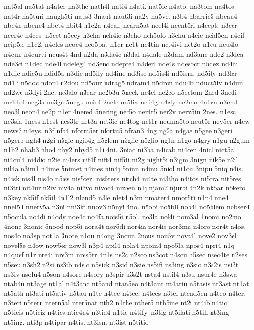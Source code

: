 {nat5al
na5tat
n4atee
na3the
nath4l
nati4
n4ati.
nat5ic
n4ato.
na3tom
na4tos
nat4r
na5turi
naugh5ti
naus3
3naut
naut3i
na2v
na5vel
n3b4
nbarric5
nbeau4
nbe4n
nbene4
nbet4
nbit4
n1c2a
n4cal.
ncarn5at
ncel4i
ncent5ri
n4cept.
n3cer
ncer4e
n4ces.
n5cet
n5cey
n3cha
nch4ie
n3cho
nch5olo
n3chu
n4cic
ncid5en
n4cif
ncip5ie
n1c2l
n4cles
ncoc4
nco5pat
n1cr
nc1t
nc4tin
nct4ivi
nct2o
n1cu
ncu4lo
n4cun
n4curvi
ncus4t
4nd
n2da
n3da4c
n3dal
n4dale
n3dam
nd3anc
nde2
n3dea
nde3ci
n1ded
nde4l
ndeleg4
nd3enc
ndepre4
n3derl
nde4s
ndes5cr
n5dez
nd4hi
n1dic
ndic5u
ndid5a
n3die
nd5ily
nd4ine
nd3ise
nd5is4i
nd5ism.
nd5ity
nd3ler
nd1li
n5doc
ndor4
n2dou
nd5our
ndrag5
ndram4
n5dron
ndu4b
nduct5iv
n4dun
nd2we
n3dyi
2ne.
ne3alo
n3ear
ne2b3u
5neck
ne4cl
ne2co
n5ectom
2ned
3nedi
ne4du4
neg3a
ne3go
5negu
neis4
2nele
ne5lia
neli4g
n4ely
ne2mo
4n1en
n3end
neo3l
neon4
ne2p
n1er
4nered
5nering
ner5o
ner4r5
ner2v
nerv5in
2nes.
n1esc
ne3sia
1ness
n1est
nes3tr
net3a
net3ic
ne4tog
net1r
neuma5to
neut5r
nev5er
n4ew
news3
n4eys.
n3f
nfo4
nform5er
nfortu5
nfran3
4ng
ng2a
n4gae
n5gee
n3geri
n5gero
ngh4
n2gi
n5gic
ngio4g
n5glem
n3glie
n5glio
ng1n
n1go
n4gry
n1gu
n2gum
n1h2
nhab3
nho4
nhy2
nhyd5
n1i
4ni.
3niac
ni3ba
n4icab
ni4cen
4nicl
nict5a
ni4cul4
ni4dio
n2ie
ni4ers
nif4f
nift4
nif5ti
ni2g
night5i
n3igm
3nign
nik5e
n2il
nil4a
n3im1
n4ime
5nimet
n4ines
nin4j
5ninn
n4inu
5niol
ni1ou
3nipu
5niq
n4is.
n4isk
nis4l
nis4o
n5iss
nis5ter.
nis5ters
nitch4
ni4te
ni3tho
n4itos
ni5tra
nit5res
ni3tri
nit4ur
n2iv
niv4a
ni3vo
nivoc4
niz5en
n1j
njam2
njur5i
4n2k
nk5ar
n5kero
n3key
nk5if
nk5il
4n1l2
nland5
n3le
nlet4
n3m
nmater4
nmor5ti
n1n4
nne4
nnel5li
nnerv5a
n3ni
nni3ki
nnov3
n5nyi
4no.
n5obi
no5bil
nob4l
no5blem
nobser4
n5ocula
no4di
n4ody
noe4c
no4fa
nois5i
n5ol.
no3la
nol4i
nom3al
1nomi
no2mo
4none
3nonic
5nood
nop5i
nora4t
nor5di
nor4ia
nor4is
nor3ma
n4oro
nor4t
n4os.
nos4o
no3sp
not1a
3note
n1ou
n4oug
3noun
2nous
nou5v
nova4l
nove2
nov3el
novel5e
n4ow
now5er
now3l
n3p4
npil4
npla4
npoin4
npo5la
npos4
npri4
n1q
n4quef
n1r
nre4i
nre3m
nres5tr
4n1s
ns2c
n2sco
ns3cot
n4scu
n5sec
nsec4te
n2ses
n5seu
n3sh2
n2si
ns3ib
n4sic
n5sick
n3sid
n3sie
ns5ifi
ns3ing
n3sio
n3s2is
nsi2t
ns3iv
nsolu4
n5son
n4sore
n4sory
n3spir
n3s2t
nsta4
nstil4
n3su
nsur4e
n3swa
ntab4u
nt3age
nt1al
n4t3anc
nt5and
ntan5eo
n4t3ant
nt4ariu
n5tasis
nt3ast
nt1at
nt5ath
nt3ati
nt5ativ
n5tau
n1te
n4tec
n4tee.
n4tees
n3tel
ntend5en
n4teo
n4ter.
n3teri
n5tern
ntern5al
nter5nat
nth2
n1the
nther5
nth5ine
nt2i
nt4ib
n4tic.
n5ticis
n5ticiz
n4tics
ntic4u4
n3tid4
n1tie
n4tify.
n3tig
nt5ilati
n5till
nt3ing
nt5ing.
nti3p
n4tipar
n4tis.
nt3ism
nt3ist
n5titio
}
